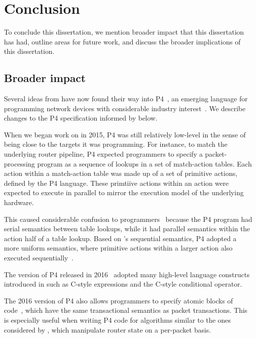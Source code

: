 \chapter{Conclusion}
\label{chap:concl}

To conclude this dissertation, we mention broader impact that this dissertation
has had, outline areas for future work, and discuss the broader implications of
this dissertation.

\section{Broader impact}
\label{s:impact}
Several ideas from \pktlanguage have now found their way into P4~\cite{p4}, an
emerging language for programming network devices with considerable industry
interest~\cite{p4org}. We describe changes to the P4 specification informed by
\pktlanguage below.
\begin{CompactEnumerate}
\item When we began work on \pktlanguage in 2015, P4 was still relatively
low-level in the sense of being close to the targets it was programming. For
instance, to match the underlying router pipeline, P4 expected programmers to
specify a packet-processing program as a sequence of lookups in a set of
match-action tables. Each action within a match-action table was made up of a
set of primitive actions, defined by the P4 language. These primtiive actions
within an action were expected to execute in parallel to mirror the execution
model of the underlying hardware.

This caused considerable confusion to programmers~\cite{p4-semantics} because
the P4 program had serial semantics between table lookups, while it had
parallel semantics within the action half of a table lookup. Based on
\pktlanguage's sequential semantics, P4 adopted a more uniform semantics, where
primitive actions within a larger action also executed
sequentially~\cite{p4_sequential_pr, p4_sequential_issue}.

\item The version of P4 released in 2016~\cite{p4_16} adopted many
high-level language constructs introduced in \pktlanguage such as C-style
expressions and the C-style conditional operator.

\item The 2016 version of P4 also allows programmers to specify atomic blocks of
code~\cite{p4_atomic_pr, p4_atomic_issue}, which have the same transactional
semantics as packet transactions. This is especially useful when writing P4
code for algorithms similar to the ones considered by \pktlanguage, which
manipulate router state on a per-packet basis.
\end{CompactEnumerate}

